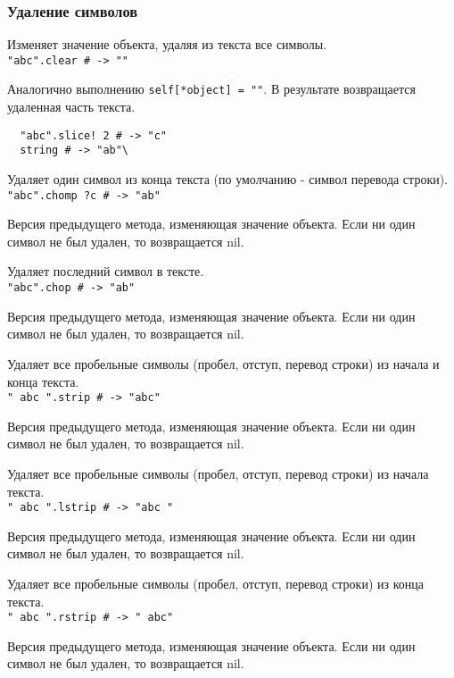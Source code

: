 \subsubsection*{Удаление символов}

\begin{methodlist}
  Изменяет значение объекта, удаляя из текста все символы.
  \\\verb!"abc".clear # -> ""!

  Аналогично выполнению \verb!self[*object] = ""!. В результате возвращается удаленная часть текста.
  \begin{verbatim}
  "abc".slice! 2 # -> "c"
  string # -> "ab"\
  \end{verbatim}

  Удаляет один символ из конца текста (по умолчанию - символ перевода строки).
  \\\verb!"abc".chomp ?c # -> "ab"!

  Версия предыдущего метода, изменяющая значение объекта. Если ни один символ не был удален, то возвращается nil.

  Удаляет последний символ в тексте.
  \\\verb!"abc".chop # -> "ab"!

  Версия предыдущего метода, изменяющая значение объекта. Если ни один символ не был удален, то возвращается nil.

  Удаляет все пробельные символы (пробел, отступ, перевод строки) из начала и конца текста.
  \\\verb!" abc ".strip # -> "abc"!

  Версия предыдущего метода, изменяющая значение объекта. Если ни один символ не был удален, то возвращается nil.

  Удаляет все пробельные символы (пробел, отступ, перевод строки) из начала текста.
  \\\verb!" abc ".lstrip # -> "abc "!

  Версия предыдущего метода, изменяющая значение объекта. Если ни один символ не был удален, то возвращается nil.

  Удаляет все пробельные символы (пробел, отступ, перевод строки) из конца текста.
  \\\verb!" abc ".rstrip # -> " abc"!

  Версия предыдущего метода, изменяющая значение объекта. Если ни один символ не был удален, то возвращается nil.
\end{methodlist}

